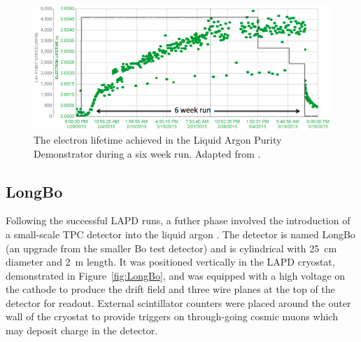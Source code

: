\begin{figure}[ht]
  \centering
  \includegraphics[width=12cm]{LAPDElectronLifetime.png}
  \caption[The electron lifetime achieved in the Liquid Argon Purity Demonstrator during a six week run.]{The electron lifetime achieved in the Liquid Argon Purity Demonstrator during a six week run.  Adapted from \cite{LAPD2014}.}
  \label{fig:LAPDElectronLifetime}
\end{figure}

\subsection{LongBo}\label{sec:LongBo}

Following the successful LAPD runs, a futher phase involved the introduction of a small-scale TPC detector into the liquid argon \cite{LongBo2015}.  The detector is named LongBo (an upgrade from the smaller Bo test detector) and is cylindrical with 25~cm diameter and 2~m length.  It was positioned vertically in the LAPD cryostat, demonstrated in Figure~\ref{fig:LongBo}, and was equipped with a high voltage on the cathode to produce the drift field and three wire planes at the top of the detector for readout.  External scintillator counters were placed around the outer wall of the cryostat to provide triggers on through-going cosmic muons which may deposit charge in the detector.

